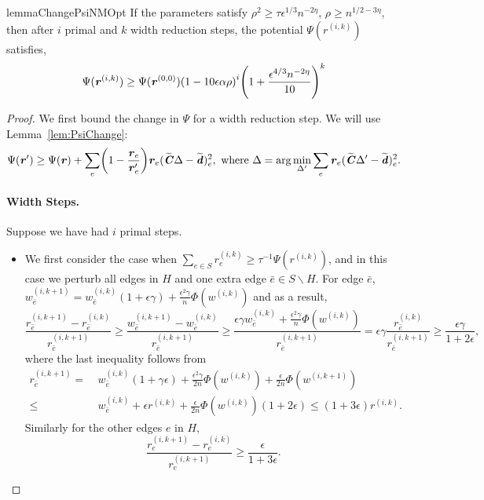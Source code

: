 \documentclass[11pt]{article}
\let\originalleft\left
\let\originalright\right
\renewcommand{\left}{\mathopen{}\mathclose\bgroup\originalleft}
\renewcommand{\right}{\aftergroup\egroup\originalright}
\newcommand\dd{\boldsymbol{\mathit{d}}}
\newcommand\rr{\boldsymbol{\mathit{r}}}
\newcommand\ww{\boldsymbol{\mathit{w}}}
\newcommand\CC{\boldsymbol{\mathit{C}}}
\newcommand{\wt}{\widetilde}
\begin{document}
\begin{restatable}{lemma}{ChangePsiNMOpt}
\label{lem:ChangePsiNMOpt}
If the parameters satisfy $\rho^2 \geq \tau \epsilon^{1/3} n^{-2\eta}$, $\rho\geq n^{1/2-3\eta}$, then after $i$ primal and $k$ width reduction steps, the potential $\Psi(\rr^{(i,k)})$ satisfies,
\[
\Psi(\rr^{(i,k)})\geq \Psi(\rr^{(0,0)})\left(1-10\epsilon\alpha\rho\right)^i\left(1+\frac{\epsilon^{4/3}n^{-2\eta}}{10}\right)^k
\]
\end{restatable}
\begin{proof}
We first bound the change in $\Psi$ for a width reduction step. We will use Lemma~\ref{lem:PsiChange}:
\begin{equation}\label{eq:PsiChangeOpt}
   \Psi(\rr')\geq \Psi(\rr) + \sum_e \left(1-\frac{\rr_e}{\rr_e'}\right)\rr_e(\wt{\CC}\Delta-\wt{\dd})_e^2, \text{ where } \Delta = \arg \min_{\Delta'} \sum_e \rr_e (\wt{\CC}\Delta'-\wt{\dd})_e^2. 
\end{equation}

\paragraph{Width Steps.}
Suppose we have had $i$ primal steps.  

\begin{itemize}
    \item We first consider the case when $\sum_{e\in S}\rr_e^{(i,k)} \geq \tau^{-1}\Psi(\rr^{(i,k)})$, and in this case we perturb all edges in $H$ and one extra edge $\bar{e} \in S \backslash H$. For edge $\bar{e}$, $\ww^{(i,k+1)}_{\bar{e}} = \ww^{(i,k)}_{\bar{e}} (1+\epsilon\gamma) +\frac{\epsilon^2\gamma}{n}\Phi(\ww^{(i,k)})$ and as a result,
\[
\frac{\rr^{(i,k+1)}_{\bar{e}}-\rr^{(i,k)}_{\bar{e}}}{\rr^{(i,k+1)}_{\bar{e}}} \geq \frac{\ww^{(i,k+1)}_{\bar{e}}-\ww^{(i,k)}_{\bar{e}} }{\rr^{(i,k+1)}_{\bar{e}}}  \geq \frac{\epsilon\gamma\ww_{\bar{e}}^{(i,k)} + \frac{\epsilon^2\gamma}{n}\Phi(\ww^{(i,k)})}{\rr_{\bar{e}}^{(i,k+1)}} = \epsilon\gamma\frac{\rr_{\bar{e}}^{(i,k)}}{\rr_{\bar{e}}^{(i,k+1)}} \geq \frac{\epsilon\gamma}{1+2\epsilon},
\]
where the last inequality follows from
\begin{align*}
\rr^{(i,k+1)}_{\bar{e}} = &~ \ww_{\bar{e}}^{(i,k)}(1+\gamma\epsilon) +\frac{\epsilon^2\gamma}{2n}\Phi(\ww^{(i,k)}) + \frac{\epsilon}{2n}
\Phi(\ww^{(i,k+1)}) \\
\leq &~ \ww_{\bar{e}}^{(i,k)} + \epsilon\rr^{(i,k)} + \frac{\epsilon}{2n}\Phi(\ww^{(i,k)})(1+2\epsilon)\leq (1+3\epsilon)\rr^{(i,k)}.
\end{align*}
Similarly for the other edges $e$ in $H$,
\[
\frac{\rr^{(i,k+1)}_{e}-\rr^{(i,k)}_e}{\rr^{(i,k+1)}_e} \geq \frac{\epsilon}{1+3\epsilon}.
\]



\end{itemize}
\end{proof}
\end{document}
